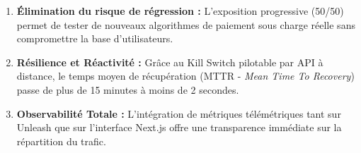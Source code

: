 \documentclass[12pt, a4paper]{article}
\begin{document}
\begin{enumerate}[label=\bfseries\arabic*.]
    \item \textbf{Élimination du risque de régression :} L'exposition progressive (50/50) permet de tester de nouveaux algorithmes de paiement sous charge réelle sans compromettre la base d'utilisateurs.
    \item \textbf{Résilience et Réactivité :} Grâce au Kill Switch pilotable par API à distance, le temps moyen de récupération (MTTR - \textit{Mean Time To Recovery}) passe de plus de 15 minutes à moins de 2 secondes.
    \item \textbf{Observabilité Totale :} L'intégration de métriques télémétriques tant sur Unleash que sur l'interface Next.js offre une transparence immédiate sur la répartition du trafic.
\end{enumerate}
\end{document}
